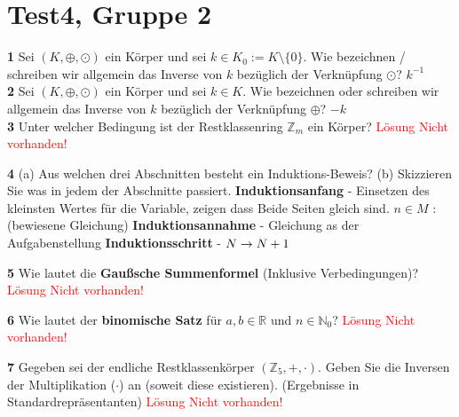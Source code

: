 \documentclass[11pt]{article}
\begin{document}
\section{Test4, Gruppe 2}

    \textbf{1} Sei \((K, \oplus, \odot)\) ein Körper und sei \(k \in K_0 := K \setminus \{0\}\). Wie bezeichnen / schreiben wir allgemein das Inverse von \(k\) bezüglich der Verknüpfung \(\odot\)?\newline
    $k^{-1}$\\

    \textbf{2} Sei \((K, \oplus, \odot)\) ein Körper und sei \(k \in K\). Wie bezeichnen oder schreiben wir allgemein das Inverse von \(k\) bezüglich der Verknüpfung \(\oplus\)?\newline
    $-k$\\

    \textbf{3} Unter welcher Bedingung ist der Restklassenring \(\mathbb{Z}_m\) ein Körper?\newline
    \textcolor{red}{Lösung Nicht vorhanden!}\newline

    \textbf{4} (a) Aus welchen drei Abschnitten besteht ein Induktions-Beweis? (b) Skizzieren Sie was in jedem der Abschnitte passiert.\newline\newline
    \textbf{Induktionsanfang} - Einsetzen des kleinsten Wertes für die Variable, zeigen dass Beide Seiten gleich sind. \(n \in M\) : (bewiesene Gleichung)\newline
    \textbf{Induktionsannahme} - Gleichung as der Aufgabenstellung\newline
    \textbf{Induktionsschritt} - $N \rightarrow N+1\newline$
    
    \textbf{5} Wie lautet die \textbf{Gaußsche Summenformel} (Inklusive Verbedingungen)?\newline
    \textcolor{red}{Lösung Nicht vorhanden!}\newline

    \textbf{6} Wie lautet der \textbf{binomische Satz} für \( a, b \in \mathbb{R} \) und \( n \in \mathbb{N}_0 \)?\newline
    \textcolor{red}{Lösung Nicht vorhanden!}\newline

    \textbf{7} Gegeben sei der endliche Restklassenkörper \((\mathbb{Z}_5, +, \cdot)\). Geben Sie die Inversen der Multiplikation (\(\cdot\)) an (soweit diese existieren). (Ergebnisse in Standardrepräsentanten)\newline
    \textcolor{red}{Lösung Nicht vorhanden!}\newline
\end{document}
